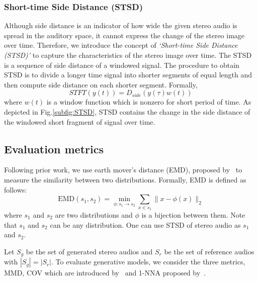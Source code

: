 \subsubsection{Short-time Side Distance (STSD)}
\label{subsubsec:stsd}
Although side distance is an indicator of how wide the given stereo audio is spread in the auditory space, it cannot express the change of the stereo image over time. Therefore, we introduce the concept of \textit{`Short-time Side Distance (STSD)'} to capture the characteristics of the stereo image over time. The STSD is a sequence of side distance of a windowed signal. The procedure to obtain STSD is to divide a longer time signal into shorter segments of equal length and then compute side distance on each shorter segment. Formally,
\begin{equation}
    STFT(y(t)) = D_{side}(y(\tau)w(t))
\end{equation}
where $w(t)$ is a window function which is nonzero for short period of time. As depicted in Fig.\ref{subfig:STSD}, STSD contains the change in the side distance of the windowed short fragment of signal over time.
\subsection{Evaluation metrics}
\label{subsec:metric}
Following prior work, we use earth mover's distance (EMD), proposed by~\cite{emd} to measure the similarity between two distributions. Formally, EMD is defined as follows:
\begin{equation}
    \text{EMD}(s_1, s_2) = \min_{\phi: s_1\to s_2} \sum_{x\in s_1} \|x-\phi(x)\|_2 \nonumber
\end{equation}
where $s_1$ and $s_2$ are two distributions and $\phi$ is a bijection between them. Note that $s_1$ and $s_2$ can be any distribution. One can use STSD of stereo audio as $s_1$ and $s_2$.

Let $S_g$ be the set of generated stereo audios and $S_r$ be the set of reference audios with $|S_g| = |S_r|$. To evaluate generative models, we consider the three metrics, MMD, COV which are introduced by~\cite{achlioptas} and 1-NNA proposed by~\cite{1-nna}.

